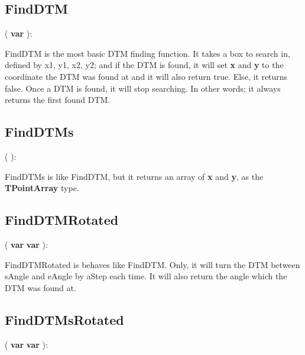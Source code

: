 \documentclass[a4paper]{report}
\begin{document}
\subsection{FindDTM}


\pfunc {}( \textbf{var}
   ):

FindDTM is the most basic DTM finding function. It takes a box to search in,
defined by x1, y1, x2, y2; and if the DTM is found, it will set \textbf{x} and 
\textbf{y} to the coordinate the DTM was found at and it will also return true. 
Else, it returns false. Once a DTM is found, it will stop searching. In other words; it always returns
the first found DTM.

\subsection{FindDTMs}

\pfunc {}( 
  ):

FindDTMs is like FindDTM, but it returns an array of \textbf{x} and \textbf{y}, as the
\textbf{TPointArray} type.

\subsection{FindDTMRotated}
\pfunc {}( \textbf{var}
   
  \textbf{var}
 ): 

FindDTMRotated is behaves like FindDTM. Only, it will turn the DTM between 
sAngle and eAngle by aStep each time. It will also return the angle which the DTM was found
at.

\subsection{FindDTMsRotated}
\pfunc {}( \textbf{var}
   
  \textbf{var}
 ): 
\end{document}
